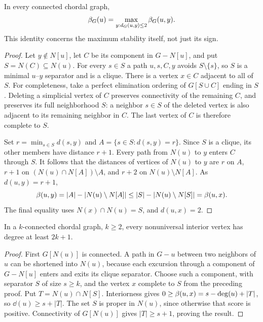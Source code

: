 \begin{theorem}\label{thm:local}
In every connected chordal graph,
\[
 \beta_G(u)=\max_{y:d_G(u,y)\le2}\beta_G(u,y).
\]
This identity concerns the maximum stability itself, not just its sign.
\end{theorem}
\begin{proof}
Let $y\notin N[u]$, let $C$ be its component in $G-N[u]$, and put
$S=N(C)\subseteq N(u)$. For every $s\in S$ a path $u,s,C,y$ avoids
$S\setminus\{s\}$, so $S$ is a minimal $u$--$y$ separator and is a clique.
There is a vertex $x\in C$ adjacent to all of $S$. For completeness, take
a perfect elimination ordering of $G[S\cup C]$ ending in $S$.
Deleting a simplicial vertex of $C$ preserves connectivity of the remaining
$C$, and preserves its full neighborhood $S$: a neighbor $s\in S$ of the
deleted vertex is also adjacent to its remaining neighbor in $C$.
The last vertex of $C$ is therefore complete to $S$.

Set $r=\min_{s\in S}d(s,y)$ and $A=\{s\in S:d(s,y)=r\}$.
Since $S$ is a clique, its other members have distance $r+1$.
Every path from $N(u)$ to $y$ enters $C$ through $S$. It follows that the
distances of vertices of $N(u)$ to $y$ are $r$ on $A$, $r+1$ on
$(N(u)\cap N[A])\setminus A$, and $r+2$ on $N(u)\setminus N[A]$.
As $d(u,y)=r+1$,
\[
 \beta(u,y)=|A|-|N(u)\setminus N[A]|
 \le |S|-|N(u)\setminus N[S]|=\beta(u,x).
\]
The final equality uses $N(x)\cap N(u)=S$, and $d(u,x)=2$.
\end{proof}

\begin{lemma}\label{lem:chordal-degree}
In a $k$-connected chordal graph, $k\ge2$, every nonuniversal interior
vertex has degree at least $2k+1$.
\end{lemma}
\begin{proof}
First $G[N(u)]$ is connected. A path in $G-u$ between two neighbors of $u$
can be shortened into $N(u)$, because each excursion through a component
of $G-N[u]$ enters and exits its clique separator.
Choose such a component, with separator $S$ of size $s\ge k$, and the
vertex $x$ complete to $S$ from the preceding proof. Put
$T=N(u)\cap N[S]$. Interiorness gives
$0\ge\beta(u,x)=s-\operatorname{deg}(u)+|T|$, so $\dd(u)\ge s+|T|$.
The set $S$ is proper in $N(u)$, since otherwise that score is positive.
Connectivity of $G[N(u)]$ gives $|T|\ge s+1$, proving the result.
\end{proof}

